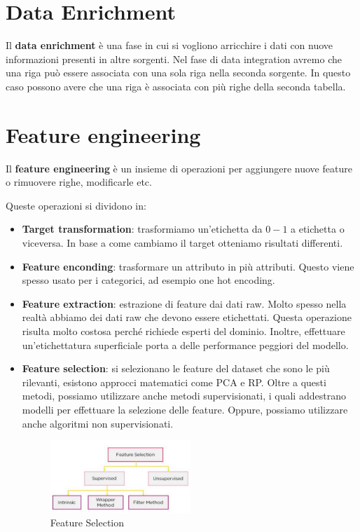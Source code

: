 \section{Data Enrichment}
Il \textbf{data enrichment} è una fase in cui si vogliono arricchire i dati con
nuove informazioni presenti in altre sorgenti. Nel fase di data integration
avremo che una riga può essere associata con una sola riga nella seconda sorgente.
In questo caso possono avere che una riga è associata con più righe della seconda
tabella.
\section{Feature engineering}
Il \textbf{feature engineering} è un insieme di operazioni per aggiungere nuove
feature o rimuovere righe, modificarle etc.

Queste operazioni si dividono in:
\begin{itemize}
      \item \textbf{Target transformation}: trasformiamo un'etichetta da $0-1$ a
            etichetta o viceversa. In base a come cambiamo il target otteniamo
            risultati differenti.
      \item \textbf{Feature enconding}: trasformare un attributo in più attributi.
            Questo viene spesso usato per i categorici, ad esempio one hot encoding.
      \item \textbf{Feature extraction}: estrazione di feature dai dati raw.
            Molto spesso nella realtà abbiamo dei dati raw che devono essere
            etichettati. Questa operazione risulta molto costosa perché richiede
            esperti del dominio. Inoltre, effettuare un'etichettatura superficiale
            porta a delle performance peggiori del modello.
      \item \textbf{Feature selection}: si selezionano le feature del dataset
            che sono le più rilevanti, esistono approcci matematici come PCA e RP.
            Oltre a questi metodi, possiamo utilizzare anche metodi supervisionati,
            i quali addestrano modelli per effettuare la selezione delle feature.
            Oppure, possiamo utilizzare anche algoritmi non supervisionati.
            \begin{figure}[!ht]
                  \centering
                  \includegraphics[width=0.5\textwidth]{./img/MLops/feature_selection.png}
                  \caption{Feature Selection}
                  \label{fig:feature_selection}
            \end{figure}
\end{itemize}
